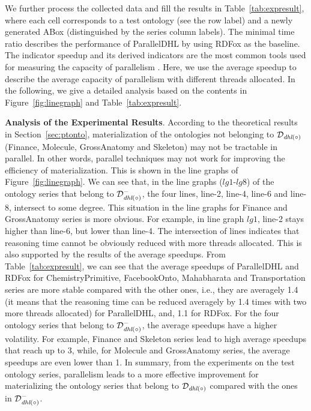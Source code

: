We further process the collected data and fill the results in Table~\ref{tab:expresult}, where each cell corresponds
to a test ontology (see the row label) and a newly generated ABox
(distinguished by the series column labels). 
The minimal time ratio describes the performance of ParallelDHL by using RDFox as the baseline.
The indicator speedup and its derived indicators are the most common tools used for measuring the capacity of parallelism \cite{MotikNPHO14,KazakovKS14,UrbaniKMHB12}.
Here, we use the average speedup \cite{ichiyoshiK92} to describe the average capacity of parallelism with different
threads allocated.
In the following, we give a detailed analysis based on the contents in Figure~\ref{fig:linegraph} and Table~\ref{tab:expresult}.

\textbf{Analysis of the Experimental Results}.
According to the theoretical results in Section~\ref{sec:ptonto},
materialization of the
ontologies not belonging to $\mathcal{D}_{\textit{\text{dhl}}(\circ)}$
(Finance, Molecule, GrossAnatomy and Skeleton)
may not be tractable in parallel. In other words,
parallel techniques may not work for improving the efficiency of materialization.
This is shown in the line graphs of Figure~\ref{fig:linegraph}.
We can see that, in the line graphs ($lg1$-$lg8$) of the ontology series
that belong to $\mathcal{D}^-_{\textit{\text{dhl}}(\circ)}$, the four lines, line-2, line-4, line-6 and line-8,
intersect to some degree. This situation in the line graphs for Finance and GrossAnatomy
series is more obvious. For example, in line graph $lg1$,
line-2 stays higher than line-6, but lower than line-4.
The intersection of lines indicates that reasoning time cannot be obviously reduced with more threads allocated.
This is also supported by the results of the average speedups.
From Table~\ref{tab:expresult}, we can see that the average speedups of ParallelDHL and RDFox
for ChemistryPrimitive, FacebookOnto, Mahabharata and Transportation series
are more stable compared with the other ones, i.e., they are averagely 1.4
(it means that the reasoning time can be reduced averagely by 1.4 times with two more threads allocated)
for ParallelDHL, and, 1.1 for RDFox. For the four ontology series that belong to $\mathcal{D}^-_{\textit{\text{dhl}}(\circ)}$,
the average speedups have a higher volatility. For example,
Finance and Skeleton series lead to high average speedups that reach up to 3,
while, for Molecule and GrossAnatomy series, the average speedups are even lower than 1.
In summary, from the experiments on the test ontology series,
parallelism leads to a more effective improvement for materializing the ontology series
that belong to $\mathcal{D}_{\textit{\text{dhl}}(\circ)}$ compared with the ones in $\mathcal{D}^-_{\textit{\text{dhl}}(\circ)}$.

